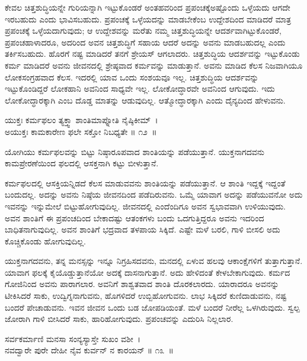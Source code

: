ಕೇವಲ ಚಿತ್ತಶುದ್ಧಿಯನ್ನೇ ಗುರಿಯನ್ನಾಗಿ ಇಟ್ಟುಕೊಂಡರೆ ಅಂತಹವರಿಂದ ಪ್ರಪಂಚಕ್ಕೆ\break ಅಷ್ಟೊಂದು ಒಳ್ಳೆಯದು ಆಗದೇ ಇರಬಹುದು ಎಂದು ಭಾವಿಸಬಹುದು. ಪ್ರಪಂಚಕ್ಕೆ ಒಳ್ಳೆಯ\-ದನ್ನು ಮಾಡ\-ಬೇಕೆಂಬ ಉದ್ದೇಶದಿಂದ ಮಾಡಿದರೆ ಮಾತ್ರ ಪ್ರಪಂಚಕ್ಕೆ ಒಳ್ಳೆಯದಾಗುವುದು; ಆ ಉದ್ದೇಶವನ್ನು ಮರೆತು ನಮ್ಮ ಚಿತ್ತಶುದ್ಧಿಯನ್ನೇ ಆದರ್ಶವಾಗಿಟ್ಟುಕೊಂಡರೆ, ಪ್ರಪಂಚ\break ಹಾಳಾದರೂ, ಅದರಿಂದ ಅವನ ಚಿತ್ತಶುದ್ಧಿಗೆ ಸಹಾಯ ಆದರೆ ಅದನ್ನು ಅವನು ಮಾಡಬಹುದಲ್ಲ ಎಂದು ತರ್ಕಿಸಬಹುದು. ಹೊರಗೆ ನಷ್ಟ ಮಾಡಿದರೆ ತನಗೆ ಶ್ರೇಯಸ್ ಆಗಲಾದರು. ಚಿತ್ತಶುದ್ಧಿಯ ಆದರ್ಶವನ್ನು ಇಟ್ಟುಕೊಂಡು ಕರ್ಮ ಮಾಡಿದರೆ ಅವನು ಜೀವನದಲ್ಲಿ ಶ್ರೇಷ್ಠವಾದ ಕರ್ಮವನ್ನು ಮಾಡುತ್ತಾನೆ. ಅವನು ಮಾಡಿದ ಕೆಲಸ ನಿಜವಾಗಿಯೂ ಲೋಕಸಂಗ್ರಹವಾದ ಕೆಲಸ. ಇದರಲ್ಲಿ ಯಾವ ಒಂದು ಸಂಶಯವೂ ಇಲ್ಲ. ಚಿತ್ತಶುದ್ಧಿಯ ಆದರ್ಶವನ್ನು ಇಟ್ಟುಕೊಂಡಿದ್ದರೆ ಲೋಕಹಾನಿ ಅವನಿಂದ ಸಾಧ್ಯವೇ ಇಲ್ಲ. ಲೋಕೋದ್ಧಾರವೇ ಅವನಿಂದ ಆಗುವುದು. ಇದು ಲೋಕೋದ್ಧಾರಕ್ಕಾಗಿ ಎಂಬ ದೊಡ್ಡ ಮಾತನ್ನು ಆಡುವುದಿಲ್ಲ. ಆತ್ಮೋದ್ಧಾರಕ್ಕಾಗಿ ಎಂದು ದೈನ್ಯದಿಂದ ಹೇಳುವನು.

\begin{shloka}
ಯುಕ್ತಃ ಕರ್ಮಫಲಂ ತ್ಯಕ್ತ್ವಾ ಶಾಂತಿಮಾಪ್ನೋತಿ ನೈಷ್ಠಿಕೀಮ್~।\\ಅಯುಕ್ತಃ ಕಾಮಕಾರೇಣ ಫಲೇ ಸಕ್ತೋ ನಿಬಧ್ಯತೇ \hfill॥ ೧೨~॥
\end{shloka}

\begin{artha}
ಯೋಗಿಯು ಕರ್ಮಫಲವನ್ನು ಬಿಟ್ಟು ನಿಷ್ಠಾರೂಪವಾದ ಶಾಂತಿಯನ್ನು ಪಡೆಯುತ್ತಾನೆ. ಯುಕ್ತ\-ನಾಗದವನು ಕಾಮಪ್ರೇರಣೆಯಿಂದ ಫಲದಲ್ಲಿ ಆಸಕ್ತನಾಗಿ ಕಟ್ಟು ಬೀಳುತ್ತಾನೆ.
\end{artha}

ಕರ್ಮಫಲದಲ್ಲಿ ಆಸಕ್ತಿಯನ್ನಿಡದೆ ಕೆಲಸ ಮಾಡುವವನು ಶಾಂತಿಯನ್ನು ಪಡೆಯುತ್ತಾನೆ. ಆ ಶಾಂತಿ ಇದ್ದಕ್ಕೆ ಇದ್ದಂತೆ ಬಂದುದಲ್ಲ. ಅದನ್ನು ಅವನು ನಿಷ್ಠೆಯ ಜೀವನದಿಂದ ಪಡೆದಿರುವನು. ಒಮ್ಮೆ ಯಾವಾಗ ಅದನ್ನು ಪಡೆಯುವನೋ ಅದು ಇವನನ್ನು ಇನ್ನುಮೇಲೆ ಬಿಟ್ಟುಹೋಗುವುದಿಲ್ಲ. ಜೀವನದಲ್ಲಿ ಎಂದೆಂದಿಗೂ ಅವನ ಸ್ವಭಾವವಾಗಿ ಉಳಿಯುವುದು. ಅವನ ಶಾಂತಿಗೆ ಈ ಪ್ರಪಂಚದಿಂದ ಬೇಕಾದಷ್ಟು ಆತಂಕಗಳು ಬಂದು ಒದಗುತ್ತಿದ್ದರೂ ಅವನು ಇದರಿಂದ ಬಾಧಿತನಾಗುವುದಿಲ್ಲ. ಅವನ ಶಾಂತಿಗೆ ಭದ್ರವಾದ ತಳಪಾಯ ಸಿಕ್ಕಿದೆ. ಎಷ್ಟೇ ಮಳೆ ಬರಲಿ, ಗಾಳಿ ಬೀಸಲಿ ಅದು ಕೊಚ್ಚಿಕೊಂಡು ಹೋಗುವುದಿಲ್ಲ.

\newpage

ಯುಕ್ತನಾಗದವನು, ತನ್ನ ಮನಸ್ಸನ್ನು ಇನ್ನೂ ನಿಗ್ರಹಿಸದವನು, ಮನದಲ್ಲಿ ಏಳುವ ಹಲವು ಆಕಾಂಕ್ಷೆಗಳಿಗೆ ತುತ್ತಾಗುತ್ತಾನೆ. ಯಾವಾಗ ಫಲಕ್ಕೆ ಕೈಯೊಡ್ಡುತ್ತಾನೆಯೋ ಅದಕ್ಕೆ ದಾಸನಾಗುತ್ತಾನೆ. ಅದು ಹೇಳಿದಂತೆ ಕೇಳಬೇಕಾಗುವುದು. ಕರ್ಮದ ಗೋಜಿನಿಂದ ಅವನು ಪಾರಾಗಲಾರ. ಅವನಿಗೆ ಶಾಶ್ವತವಾದ ಶಾಂತಿ ದೊರಕಲಾರದು. ಯಾರಾದರೂ ಅವನನ್ನು ಟೀಕಿಸಿದರೆ ಸಾಕು, ಉದ್ವಿಗ್ನನಾಗುವನು, ಹೊಗಳಿದರೆ ಉಬ್ಬಿಹೋಗುವನು. ಲಾಭ ಸಿಕ್ಕಿದರೆ ಕುಣಿದಾಡುವನು, ನಷ್ಟ ಬಂದರೆ ಪೇಚಾಡುವನು. ಇವನ ಜೀವನ ಒಂದು ಬಡ ಜೋಪಡಿಯಂತೆ. ಮಳೆ ಬಂದರೆ ನೀರೆಲ್ಲ ಒಳಗಿರುವುದು. ಸ್ವಲ್ಪ ಜೋರಾಗಿ ಗಾಳಿ ಬೀಸಿದರೆ ಸಾಕು, ಹಾರಿಹೋಗುವುದು. ಪ್ರಪಂಚವನ್ನು ಎದುರಿಸಿ ನಿಲ್ಲಲಾರ.

\begin{shloka}
ಸರ್ವಕರ್ಮಾಣಿ ಮನಸಾ ಸಂನ್ಯಸ್ಯಾಸ್ತೇ ಸುಖಂ ವಶೀ~।\\ನವದ್ವಾರೇ ಪುರೇ ದೇಹೀ ನೈವ ಕುರ್ವನ್ ನ ಕಾರಯನ್ \hfill॥ ೧೩~॥
\end{shloka}

